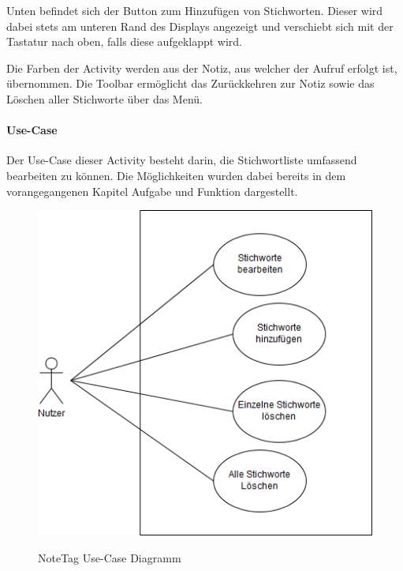 Unten befindet sich der Button zum Hinzufügen von Stichworten. Dieser wird dabei stets am unteren Rand des Displays angezeigt und verschiebt sich mit der Tastatur nach oben, falls diese aufgeklappt wird.

Die Farben der Activity werden aus der Notiz, aus welcher der Aufruf erfolgt ist, übernommen. Die Toolbar ermöglicht das Zurückkehren zur Notiz sowie das Löschen aller Stichworte über das Menü.

\paragraph{Use-Case}
Der Use-Case dieser Activity besteht darin, die Stichwortliste umfassend bearbeiten zu können. Die Möglichkeiten wurden dabei bereits in dem vorangegangenen Kapitel Aufgabe und Funktion dargestellt. 

\begin{figure}[H]
\centering
\begin{minipage}[t]{1\textwidth} %
\caption{NoteTag Use-Case Diagramm} %
\includegraphics[width=1 \textwidth]{img/noteTagsUseCase}\\ %
\end{minipage}
\end{figure}

